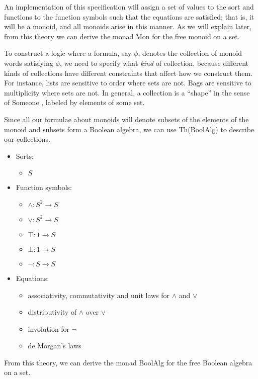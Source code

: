 \documentclass{article}
\newcommand{\maps}{\colon}
\begin{document}
An implementation of this specification will assign a set of values to the sort and functions to the function symbols such that the equations are satisfied; that is, it will be a monoid, and all monoids arise in this manner.  As we will explain later, from this theory we can derive the monad Mon for the free monoid on a set.

To construct a logic where a formula, say $\phi$, denotes the collection of monoid words satisfying $\phi$, we need to specify what \emph{kind} of collection, because different kinds of collections have different constraints that affect how we construct them. For instance, lists are sensitive to order where sets are not. Bags are sensitive to multiplicity where sets are not.  In general, a collection is a ``shape'' in the sense of Someone \cite{someone}, labeled by elements of some set.

Since all our formulae about monoids will denote subsets of the elements of the monoid and subsets form a Boolean algebra, we can use Th(BoolAlg) to describe our collections.
\begin{center}
  \begin{itemize}
    \item Sorts:
    \begin{itemize}
      \item $S$
    \end{itemize}
    \item Function symbols:
    \begin{itemize}
      \item $\land\maps S^2 \to S$
      \item $\lor\maps S^2 \to S$
      \item $\top\maps 1 \to S$
      \item $\bot\maps 1 \to S$
      \item $\neg\maps S \to S$
    \end{itemize}
    \item Equations:
    \begin{itemize}
      \item associativity, commutativity and unit laws for $\land$ and $\lor$
      \item distributivity of $\land$ over $\lor$
      \item involution for $\neg$
      \item de Morgan's laws
    \end{itemize}
  \end{itemize}
\end{center}
From this theory, we can derive the monad BoolAlg for the free Boolean algebra on a set.
\end{document}
